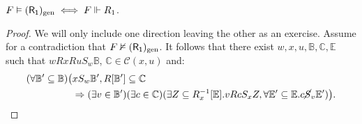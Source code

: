 \documentclass[twoside]{aiml20}
\newcommand{\principle}[1]{\text{$\mathsf{#1}$}}
\newcommand{\kgen}[1]{\ensuremath{(\mathsf{#1})\textsubscript{gen}}}
\begin{document}
\begin{theorem}
\label{orgf5f9e93}
$F\vDash \kgen{R_1}\iff F\Vdash R_1$.
\end{theorem}

\begin{proof}


\boxed{\Leftarrow } We will only include one direction leaving the other as an exercise. Assume for a contradiction that \(F\nvDash \kgen{R_1}\). It follows that
there exist \(w,x,u,\mathbb{B},\mathbb{C},\mathbb{E}\) such that \(wRxRuS_w\mathbb{B}\), \(\mathbb{C}\in \mathcal{C}(x,u)\) and:
\begin{align*}
    (\forall \mathbb{B}'\subseteq \mathbb{B})\big( & xS_w\mathbb{B}', R[\mathbb{B}']\subseteq \mathbb{C}\\
    &\Rightarrow  (\exists v\in \mathbb{B}')(\exists c\in \mathbb{C})(\exists Z\subseteq R_x^{-1}[\mathbb{E}].vRcS_xZ,\forall \mathbb{E}'\subseteq \mathbb{E}.
      c\cancel{S}_v \mathbb{E}')\big).
\end{align*}


\end{proof}
\end{document}
